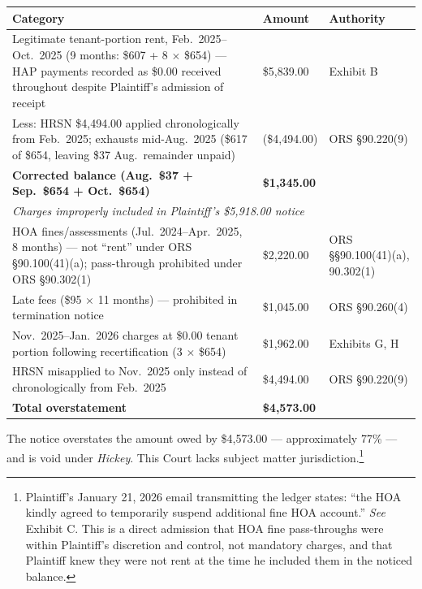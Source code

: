 \documentclass[12pt,letterpaper]{article}
\begin{document}
\vspace{6pt}
\begin{singlespace}
\noindent\begin{longtable}{|p{3.2in}|p{0.9in}|p{1.5in}|}
\hline
\textbf{Category} & \textbf{Amount} & \textbf{Authority} \\
\hline
Legitimate tenant-portion rent, Feb.\ 2025--Oct.\ 2025 (9 months: \$607 + 8 $\times$ \$654) --- HAP payments recorded as \$0.00 received throughout despite Plaintiff's admission of receipt & \$5,839.00 & Exhibit B \\
\hline
Less: HRSN \$4,494.00 applied chronologically from Feb.\ 2025; exhausts mid-Aug.\ 2025 (\$617 of \$654, leaving \$37 Aug.\ remainder unpaid) & (\$4,494.00) & ORS \S90.220(9) \\
\hline
\textbf{Corrected balance (Aug.\ \$37 + Sep.\ \$654 + Oct.\ \$654)} & \textbf{\$1,345.00} & \\
\hline
\multicolumn{3}{|l|}{\textit{Charges improperly included in Plaintiff's \$5,918.00 notice}} \\
\hline
HOA fines/assessments (Jul.\ 2024--Apr.\ 2025, 8 months) --- not ``rent'' under ORS \S90.100(41)(a); pass-through prohibited under ORS \S90.302(1) & \$2,220.00 & ORS \S\S90.100(41)(a), 90.302(1) \\
\hline
Late fees (\$95 $\times$ 11 months) --- prohibited in termination notice & \$1,045.00 & ORS \S90.260(4) \\
\hline
Nov.\ 2025--Jan.\ 2026 charges at \$0.00 tenant portion following recertification (3 $\times$ \$654) & \$1,962.00 & Exhibits G, H \\
\hline
HRSN misapplied to Nov.\ 2025 only instead of chronologically from Feb.\ 2025 & \$4,494.00 & ORS \S90.220(9) \\
\hline
\textbf{Total overstatement} & \textbf{\$4,573.00} & \\
\hline
\end{longtable}
\end{singlespace}

The notice overstates the amount owed by \$4,573.00 --- approximately 77\% --- and is void under \textit{Hickey}. This Court lacks subject matter jurisdiction.\footnote{Plaintiff's January 21, 2026 email transmitting the ledger states: ``the HOA kindly agreed to temporarily suspend additional fine HOA account.'' \textit{See} Exhibit C. This is a direct admission that HOA fine pass-throughs were within Plaintiff's discretion and control, not mandatory charges, and that Plaintiff knew they were not rent at the time he included them in the noticed balance.}
\end{document}
